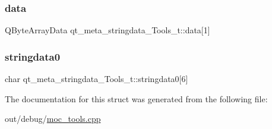 \subsubsection{\texorpdfstring{data}{data}}
{\footnotesize\ttfamily Q\+Byte\+Array\+Data qt\+\_\+meta\+\_\+stringdata\+\_\+\+Tools\+\_\+t\+::data\mbox{[}1\mbox{]}}

\mbox{\label{structqt__meta__stringdata___tools__t_a5bc504d522d8c0a46a719adc4409156a}} 
\subsubsection{\texorpdfstring{stringdata0}{stringdata0}}
{\footnotesize\ttfamily char qt\+\_\+meta\+\_\+stringdata\+\_\+\+Tools\+\_\+t\+::stringdata0\mbox{[}6\mbox{]}}



The documentation for this struct was generated from the following file\+:\begin{DoxyCompactItemize}
\item 
out/debug/\mbox{\hyperlink{moc__tools_8cpp}{moc\+\_\+tools.\+cpp}}\end{DoxyCompactItemize}
